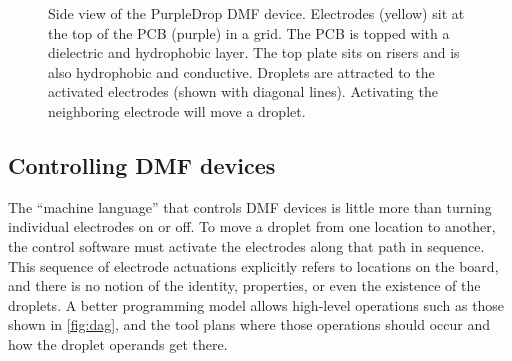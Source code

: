 \documentclass{jpaper}
\begin{document}
\begin{figure}
  \centering

  \caption{
    Side view of the PurpleDrop DMF device.
    Electrodes (yellow) sit at the top of the PCB (purple) in a grid.
    The PCB is topped with a dielectric and hydrophobic layer.
    The top plate sits on risers and is also hydrophobic and conductive.
    Droplets are attracted to the activated electrodes (shown with diagonal lines).
    Activating the neighboring electrode will move a droplet.
  }
  \label{fig:board-side}
\end{figure}

\subsection{Controlling DMF devices}
\label{sec:dmf-software}

The ``machine language'' that controls DMF devices is little more than turning individual electrodes on or off.
To move a droplet from one location to another, the control software must activate the electrodes along that path in sequence.
This sequence of electrode actuations explicitly refers to locations on the board, and there is no notion of the identity, properties, or even the existence of the droplets.
A better programming model allows high-level operations such as those shown in \autoref{fig:dag}, and the tool plans where those operations should occur and how the droplet operands get there.
\end{document}
